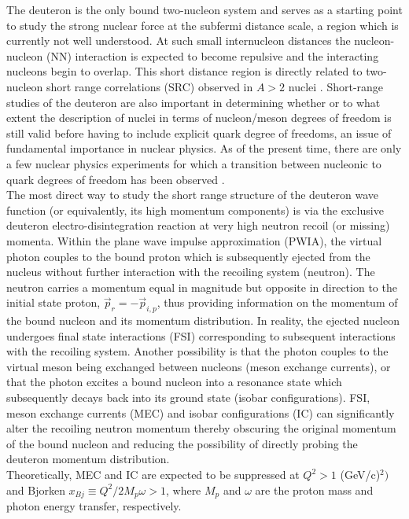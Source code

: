The deuteron is the only bound two-nucleon  system and serves as a starting point to study the strong nuclear force at the subfermi distance scale, a region which is currently
not well understood. At such small internucleon distances the nucleon-nucleon (NN) interaction is expected to become repulsive and the interacting
nucleons begin to overlap. 
This short distance region is directly related to two-nucleon short range correlations (SRC) observed in $A>2$ nuclei \cite{PhysRevC.68.014313,PhysRevLett.96.082501,PhysRevLett.99.072501,Fomin_2017}.
Short-range studies of the deuteron are also important in determining whether or to what extent the description of nuclei in terms of nucleon/meson degrees of freedom is still valid before
having to include explicit quark degree of freedoms, an issue of fundamental importance in nuclear physics\cite{pr01-020}. As of the present time, there are only a few nuclear physics experiments for
which a transition between nucleonic to quark degrees of freedom has been observed \cite{PhysRevLett.81.4576,PhysRevLett.87.102302,PhysRevC.66.042201}. \\
\indent The most direct way to study the short range structure of the deuteron wave function (or equivalently, its high momentum components) is via the exclusive deuteron
electro-disintegration reaction at very high neutron recoil (or missing) momenta. Within the plane wave impulse approximation (PWIA), the virtual photon couples to
the bound proton which is subsequently ejected from the nucleus without further interaction with the recoiling system (neutron). The neutron carries a momentum equal in magnitude but opposite in direction
to the initial state proton, $\vec{p}_{r} = -\vec{p}_{i,p}$, thus providing information on the momentum of the bound nucleon and its momentum distribution. 
In reality, the ejected nucleon undergoes final state interactions (FSI) corresponding to subsequent interactions with the recoiling system. Another possibility is that the
photon couples to the virtual meson being exchanged between nucleons (meson exchange currents), or that the photon excites a bound nucleon into a resonance state which subsequently
decays back into its ground state (isobar configurations).  FSI, meson exchange currents (MEC) and isobar configurations (IC)  can significantly alter the recoiling neutron
momentum thereby obscuring the original momentum of the bound nucleon and reducing the possibility of directly probing the deuteron momentum distribution. \\
\indent Theoretically, MEC and IC are expected to be suppressed at $Q^{2}>1$ (GeV/c)$^{2})$ and Bjorken $x_{Bj}\equiv Q^{2}/2M_{p}\omega>1$, where $M_{p}$ and $\omega$ are the proton mass and photon energy transfer, respectively.
